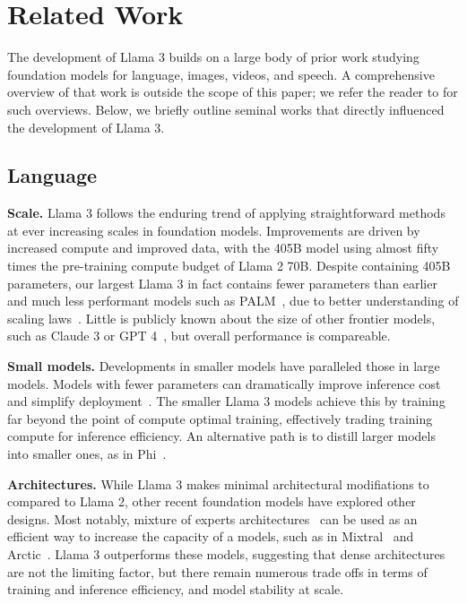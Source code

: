 \section{Related Work}
\label{section:related_work}
The development of Llama 3 builds on a large body of prior work studying foundation models for language, images, videos, and speech. A comprehensive overview of that work is outside the scope of this paper; we refer the reader to \citet{bordes2024vlm,madan2024foundation,LLMSurvey} for such overviews. Below, we briefly outline seminal works that directly influenced the development of Llama 3.

\subsection{Language}
\label{section:related_work_language}

\textbf{Scale.}
Llama 3 follows the enduring trend of applying straightforward methods at ever increasing scales in foundation models. Improvements are driven by increased compute and improved data, with the 405B model using almost fifty times the pre-training compute budget of Llama 2 70B. Despite containing 405B parameters, our largest Llama 3 in fact contains fewer parameters than earlier and much less performant models such as PALM~\citep{chowdhery2023palm}, due to better understanding of scaling laws~\citep{kaplan2020scaling,hoffmann2022chinchilla}. Little is publicly known about the size of other frontier models, such as Claude 3 or GPT 4~\citep{openai2023gpt4}, but overall performance is compareable. 

\textbf{Small models.} Developments in smaller models have paralleled those in large models. Models with fewer parameters can dramatically improve inference cost and simplify deployment~\citep{mehta2024openelm,team2024gemma}. The smaller Llama 3 models achieve this by training far beyond the point of compute optimal training, effectively trading training compute for inference efficiency. An alternative path is to distill larger models into smaller ones, as in Phi~\citep{abdin2024phi}.

\textbf{Architectures.}
While Llama 3 makes minimal architectural modifiations to compared to Llama 2, other recent foundation models have explored other designs. Most notably, mixture of experts architectures~\citep{shazeer2017moe,lewis2021base,fedus2022switch,zhou2022mixture} can be used as an efficient way to increase the capacity of a models, such as in Mixtral~\citep{jiang2024mixtral} and Arctic~\citep{snowflakearctic}. Llama 3 outperforms these models, suggesting that dense architectures are not the limiting factor, but there remain numerous trade offs in terms of training and inference efficiency, and model stability at scale.

